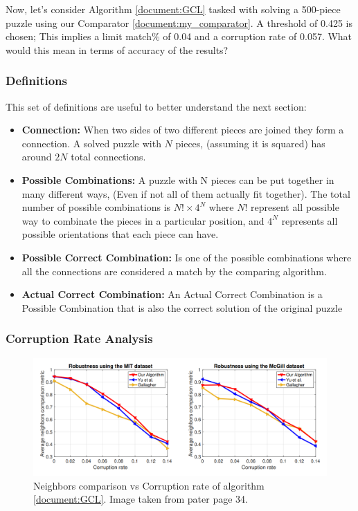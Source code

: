 \documentclass{article}
\begin{document}
Now, let's consider Algorithm \ref{document:GCL} tasked with solving a 500-piece puzzle
using our Comparator \ref{document:my_comparator}.
A threshold of 0.425 is chosen;
This implies a limit match\% of 0.04 and a corruption rate of 0.057.
What would this mean in terms of accuracy of the results?

\subsubsection{Definitions}\label{document:proof_definitions}
This set of definitions are useful to better understand the next section:

\begin{itemize}
  \item \textbf{Connection:}\newline
  When two sides of two different pieces are joined they form a connection.
  A solved puzzle with \(N\) pieces, (assuming it is squared) has around \(2N\) total connections.

  \item \textbf{Possible Combinations:}\newline
  A puzzle with N pieces can be put together in many different ways,
  (Even if not all of 	them actually fit together).
  The total number of possible combinations is \(N! \times 4^N\) where
  \(N!\) represent all possible way to combinate the pieces in a particular position, and
  \(4^N\) represents all possible orientations that each piece can have.
  \item \textbf{Possible Correct Combination:}\newline
  Is one of the possible combinations where all the connections are considered a match
  by the comparing algorithm.
  \item \textbf{Actual Correct Combination:}\newline
  An Actual Correct Combination is a Possible Combination that
  is also the correct solution of the original puzzle	
\end{itemize}

\subsubsection{Corruption Rate Analysis}
\begin{figure}[h]
  \caption{Neighbors comparison vs Corruption rate of algorithm \ref{document:GCL}. Image taken from pater \cite{GCL} page 34.}\label{fig:GCL_Corruption_Rate}
  \centering
  \includegraphics[height=0.35\textwidth]{pictures/corruption_rate.png}
\end{figure}
\end{document}
